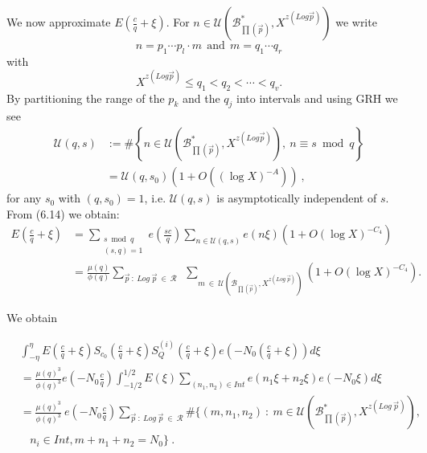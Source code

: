 \documentclass{amsart}
\numberwithin{equation}{subsection}
\begin{document}
We now approximate $E\left(\frac{c}{q}+\xi\right)$. For $n\in \mathcal{U}\left( \mathcal{B}^*_{\prod(\vec{p})}, X^{z(Log \vec{p})}\right)$ we write
$$n=p_1\cdots p_l\cdot m\ \ \text{and}\ \ m=q_1\cdots q_r$$
with
$$X^{z(Log \vec{p})} \leq q_1< q_2<\cdots <q_v.$$
By partitioning the range of the $p_k$  and the $q_j$ into intervals and using GRH we see
\begin{align*}
\mathcal{U}(q, s)&:=\# \left\{ n\in \mathcal{U}\left( \mathcal{B}^*_{\prod(\vec{p})}, X^{z(Log \vec{p})}\right),\ n\equiv s \bmod q\right\}  \tag{6.14}\\
&=\mathcal{U}(q, s_0)\left(1+O((\log X)^{-A})\right)\:,
\end{align*}
for any $s_0$ with $(q, s_0)=1$, i.e. $\mathcal{U}(q, s)$ is asymptotically independent of $s$.\\
From (6.14) we obtain:
\begin{align*}
E\left(\frac{c}{q}+\xi\right)&=\sum_{\substack{s \bmod q \\ (s, q)=1}} e\left(\frac{sc}{q}\right) \sum_{n\in \mathcal{U}(q, s)} e(n\xi)(1+O(\log X)^{-C_4})\\
&=\frac{\mu(q)}{\phi(q)} \sum_{\vec{p}\::\: Log\: \vec{p}\:\in\: \mathcal{R}}\ \  \sum_{m\:\in\: \mathcal{U}(\mathcal{B}_{\prod(\vec{p})}, X^{z(Log\: \vec{p})})}  (1+O(\log X)^{-C_4}).
\end{align*}

We obtain

\begin{align*}
&\int_{-\eta}^{\eta} E\left(\frac{c}{q}+\xi\right) S_{c_0}\left(\frac{c}{q}+\xi\right)S_{Q}^{(i)}\left(\frac{c}{q}+\xi\right) e\left(-N_0\left(\frac{c}{q}+\xi\right)\right) d\xi  \tag{6.15}\\
&=\frac{\mu(q)^3}{\phi(q)^3} e\left(-N_0\frac{c}{q}\right) \int_{-1/2}^{1/2} E(\xi)\sum_{(n_1, n_2)\in Int} e(n_1\xi+n_2\xi) e(-N_0\xi) d\xi\\
&=\frac{\mu(q)^3}{\phi(q)^3}\ e\left(-N_0\frac{c}{q}\right) \sum_{\vec{p}\::\: Log\: \vec{p}\:\in\: \mathcal{R}} \#\Big\{(m, n_1, n_2)\::\: m\in \mathcal{U}\left( \mathcal{B}^*_{\prod(\vec{p})}, X^{z(Log\: \vec{p})}\right),\\
&\ \ \ \  n_i\in Int, m+n_1+n_2=N_0\Big\}\:.
\end{align*}
\end{document}
